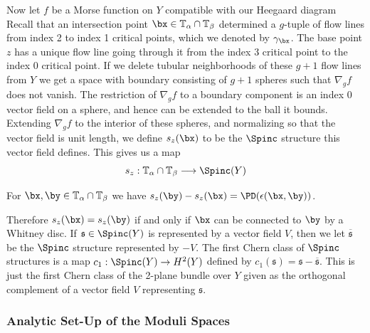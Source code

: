 Now let $f$ be a Morse function on $Y$ compatible with our Heegaard diagram Recall that an intersection point $\bx \in \mathbb T_\alpha \cap \mathbb T_\beta$ determined a $g$-tuple of flow lines from index 2 to index 1 critical points, which we denoted by $\gamma_\bx$. The base point $z$ has a unique flow line going through it from the index 3 critical point to the index 0 critical point. If we delete tubular neighborhoods of these $g+1$ flow lines from $Y$ we get a space with boundary consisting of $g+1$ spheres such that $\nabla_g f$ does not vanish. The restriction of $\nabla_g f$ to a boundary component is an index 0 vector field on a sphere, and hence can be extended to the ball it bounds. Extending $\nabla_g f$ to the interior of these spheres, and normalizing so that the vector field is unit length, we define $s_z(\bx)$ to be the $\Spinc$ structure this vector field defines. This gives us a map
\[ s_z : \mathbb T_\alpha \cap \mathbb T_\beta \longrightarrow \Spinc(Y) \]

\begin{lem}
For $\bx,\by \in \mathbb T_\alpha \cap \mathbb T_\beta$ we have $s_z(\by)-s_z(\bx)=\PD(\epsilon(\bx,\by))$.
\end{lem}

Therefore $s_z(\bx)=s_z(\by)$ if and only if $\bx$ can be connected to $\by$ by a Whitney disc. If $\mathfrak s \in \Spinc(Y)$ is represented by a vector field $V$, then we let $\overline{\mathfrak s}$ be the $\Spinc$ structure represented by $-V$. The first Chern class of $\Spinc$ structures is a map $c_1 : \Spinc(Y) \rightarrow H^2(Y)$ defined by $c_1(\mathfrak s) = \mathfrak s-\overline{\mathfrak s}$. This is just the first Chern class of the 2-plane bundle over $Y$ given as the orthogonal complement of a vector field $V$ representing $\mathfrak s$.








\subsubsection*{Analytic Set-Up of the Moduli Spaces}



